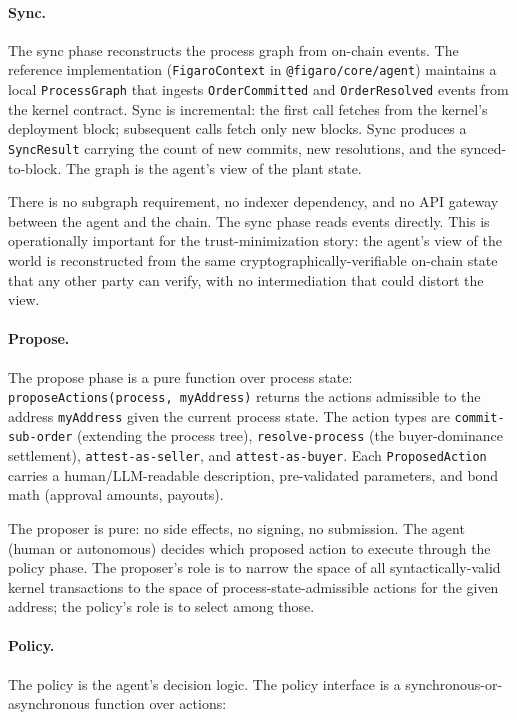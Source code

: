 \documentclass[11pt,a4paper]{article}
\theoremstyle{definition}
\theoremstyle{remark}
\begin{document}
\paragraph{Sync.}
The sync phase reconstructs the process graph from on-chain events.
The reference implementation (\texttt{FigaroContext} in
\texttt{@figaro/core/agent}) maintains a local
\texttt{ProcessGraph} that ingests \texttt{OrderCommitted}
and \texttt{OrderResolved} events from the kernel contract. Sync
is incremental: the first call fetches from the kernel's deployment
block; subsequent calls fetch only new blocks. Sync produces
a \texttt{SyncResult} carrying the count of new commits, new
resolutions, and the synced-to-block. The graph is the agent's
view of the plant state.

There is no subgraph requirement, no indexer dependency, and no
API gateway between the agent and the chain. The sync phase reads
events directly. This is operationally important for the
trust-minimization story: the agent's view of the world is
reconstructed from the same cryptographically-verifiable on-chain
state that any other party can verify, with no intermediation
that could distort the view.

\paragraph{Propose.}
The propose phase is a pure function over process state:
\texttt{proposeActions(process, myAddress)} returns the actions
admissible to the address \texttt{myAddress} given the current
process state. The action types are
\texttt{commit-sub-order} (extending the process tree),
\texttt{resolve-process} (the buyer-dominance settlement),
\texttt{attest-as-seller}, and \texttt{attest-as-buyer}.
Each \texttt{ProposedAction} carries a human/LLM-readable
description, pre-validated parameters, and bond math (approval
amounts, payouts).

The proposer is pure: no side effects, no signing, no submission.
The agent (human or autonomous) decides which proposed action to
execute through the policy phase. The proposer's role is to
narrow the space of all syntactically-valid kernel transactions to
the space of process-state-admissible actions for the given
address; the policy's role is to select among those.

\paragraph{Policy.}
The policy is the agent's decision logic. The policy interface is
a synchronous-or-asynchronous function over actions:
\end{document}

